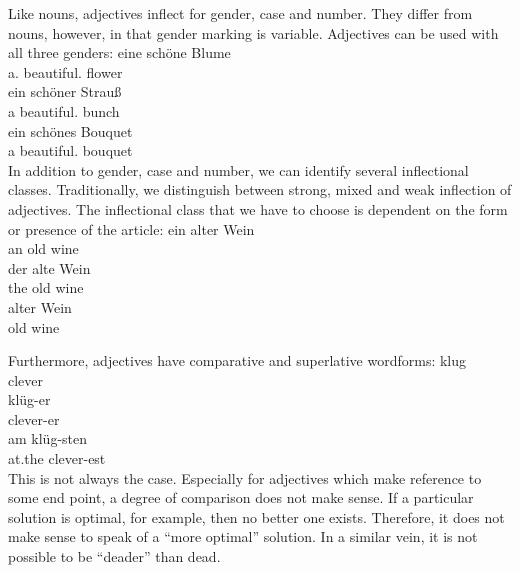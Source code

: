 Like nouns, adjectives inflect for gender, case and number. They differ from nouns, however, in that
gender marking is variable. Adjectives can be used with all three genders:
\eal
\ex 
\gll eine schöne Blume\\
     a.\fem{} beautiful.\fem{} flower\\
\ex 
\gll ein schöner          Strauß\\
     a   beautiful.\mas{} bunch\\
\ex 
\gll ein schönes Bouquet\\
     a beautiful.\neu{} bouquet\\
\zl
In addition to gender, case and number, we can identify several inflectional classes. Traditionally, we distinguish between strong, mixed and weak 
inflection of adjectives. The inflectional class\label{page-Flexionsklasse-Wunderlich} that we have to choose is dependent on the 
form or presence of the article:
\eal
\ex 
\gll ein alter Wein\\
     an old wine\\
\ex
\gll der alte Wein\\
     the old wine\\
\ex 
\gll alter Wein\\
     old wine\\
\zl



Furthermore, adjectives have comparative and superlative wordforms:
\eal
\ex 
\gll klug\\
     clever\\
\ex 
\gll klüg-er\\
     clever-er\\
\ex 
\gll am klüg-sten\\
     at.the clever-est\\
\zl
This is not always the case. Especially for adjectives which make reference to some end point, a degree of comparison does not make sense.
If a particular solution is optimal, for example, then no better one exists.
Therefore, it does not make sense to speak of a ``more optimal'' solution. In a similar vein, it is not possible to
be ``deader'' than dead.

